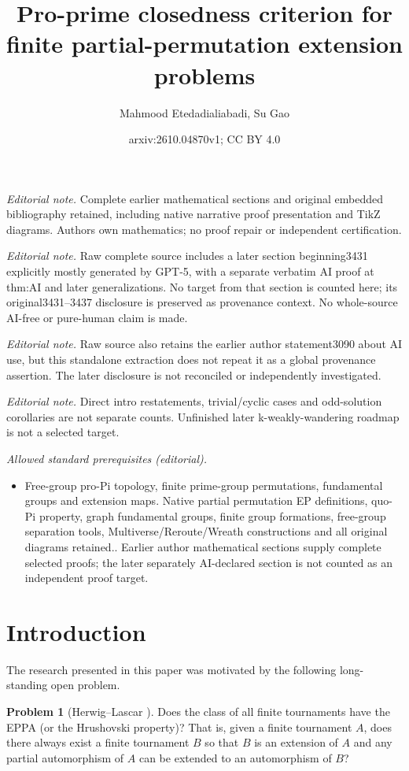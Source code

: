 \documentclass[10pt,a4paper]{amsart}
\title{Pro-prime closedness criterion for finite partial-permutation extension problems}
\author{Mahmood Etedadialiabadi, Su Gao}
\date{arxiv:2610.04870v1; CC BY 4.0}
\theoremstyle{definition}
\newtheorem{problem}[theorem]{Problem}
\theoremstyle{definition}
\numberwithin{equation}{section}
\begin{document}
\maketitle
\noindent\textit{Editorial note.} Complete earlier mathematical sections and original embedded bibliography retained, including native narrative proof presentation and TikZ diagrams. Authors own mathematics; no proof repair or independent certification.\par\medskip
\noindent\textit{Editorial note.} Raw complete source includes a later section beginning3431 explicitly mostly generated by GPT-5, with a separate verbatim AI proof at thm:AI and later generalizations. No target from that section is counted here; its original3431--3437 disclosure is preserved as provenance context. No whole-source AI-free or pure-human claim is made.\par\medskip
\noindent\textit{Editorial note.} Raw source also retains the earlier author statement3090 about AI use, but this standalone extraction does not repeat it as a global provenance assertion. The later disclosure is not reconciled or independently investigated.\par\medskip
\noindent\textit{Editorial note.} Direct intro restatements, trivial/cyclic cases and odd-solution corollaries are not separate counts. Unfinished later k-weakly-wandering roadmap is not a selected target.\par\medskip
\noindent\textit{Allowed standard prerequisites (editorial).}\begin{itemize}
\item Free-group pro-Pi topology, finite prime-group permutations, fundamental groups and extension maps. Native partial permutation EP definitions, quo-Pi property, graph fundamental groups, finite group formations, free-group separation tools, Multiverse/Reroute/Wreath constructions and all original diagrams retained.. Earlier author mathematical sections supply complete selected proofs; the later separately AI-declared section is not counted as an independent proof target.
\end{itemize}\medskip
\section{Introduction}

The research presented in this paper was motivated by the following long-standing open problem.


\begin{problem} [Herwig--Lascar \cite{HL00}]\label{prob:1.1} Does the class of all finite tournaments have the EPPA (or the Hrushovski property)? That is, given a finite tournament $A$, does there always exist a finite tournament $B$ so that $B$ is an extension of $A$ and any partial automorphism of $A$ can be extended to an automorphism of $B$?
\end{problem}
\end{document}
